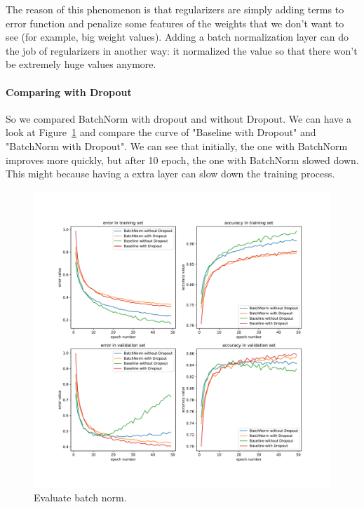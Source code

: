 \documentclass{article}
\begin{document}
The reason of this phenomenon is that regularizers are simply adding terms to error function and penalize some features of the weights that we don't want to see (for example, big weight values). Adding a batch normalization layer can do the job of regularizers in another way: it normalized the value so that there won't be extremely huge values anymore.


\paragraph{Comparing with Dropout} So we compared BatchNorm with dropout and without Dropout. We can have a look at Figure~\ref{fig:batchnorm} and compare the curve of "Baseline with Dropout" and "BatchNorm with Dropout". We can see that initially, the one with BatchNorm improves more quickly, but after 10 epoch, the one with BatchNorm slowed down. This might because having a extra layer can slow down the training process. %


\begin{figure}[tb]
\begin{center}
\centerline{\includegraphics[width=\columnwidth]{fig/batchnorm.pdf}}
\caption{Evaluate batch norm.}
\label{fig:batchnorm}
\end{center}
\end{figure} 
\end{document}
